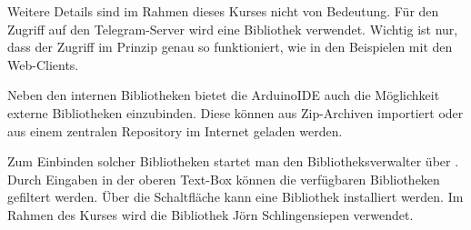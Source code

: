 Weitere Details sind im Rahmen dieses Kurses nicht von Bedeutung. Für den Zugriff auf 
den Telegram-Server wird eine Bibliothek verwendet. Wichtig ist nur, dass der Zugriff
im Prinzip genau so funktioniert, wie in den Beispielen mit den Web-Clients. 


Neben den internen Bibliotheken bietet die ArduinoIDE auch die Möglichkeit externe Bibliotheken einzubinden. Diese können aus
Zip-Archiven importiert oder aus einem zentralen Repository im Internet geladen werden.


Zum Einbinden solcher Bibliotheken startet man den Bibliotheksverwalter über . 
Durch Eingaben in der oberen Text-Box können die verfügbaren Bibliotheken gefiltert werden. Über die Schaltfläche
 kann eine Bibliothek installiert werden. Im Rahmen des Kurses wird die Bibliothek 
{Jörn Schlingensiepen} verwendet.


